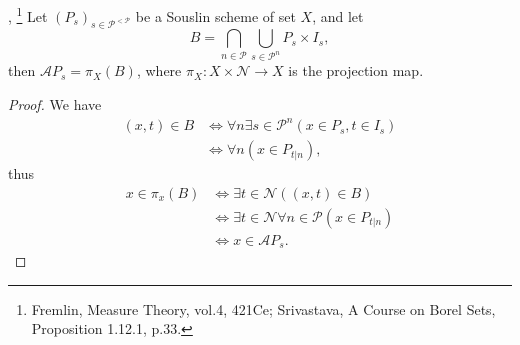 \begin{lemma} \label{L:souslin_prop},
  \footnote{Fremlin, Measure Theory, vol.4, 421Ce;
    Srivastava, A Course on Borel Sets, Proposition 1.12.1, p.33.}
Let $(P_s)_{s\in\mathcal{P}^{<\mathcal{P}}}$ be a Souslin scheme of set $X$, 
and let
\[
  B = \bigcap_{n\in\mathcal{P}} \bigcup_{s\in\mathcal{P}^n}
      P_s \times I_s,
\]
then $\mathcal{A} P_s = \pi_X(B)$, where $\pi_X: X\times\mathcal{N}\to X$ is the
projection map.
\end{lemma}
\begin{proof}
We have
\begin{align*}
  (x,t)\in B 
    & \iff \forall n \exists s\in\mathcal{P}^n (x\in P_s, t\in I_s) \\
    & \iff \forall n (x\in P_{t|n}),
\end{align*}
thus
\begin{align*}
  x\in \pi_x(B)
	& \iff \exists t\in\mathcal{N} ((x,t)\in B) \\
	& \iff \exists t\in\mathcal{N} \forall n\in\mathcal{P} (x\in P_{t|n}) \\
	& \iff x\in \mathcal{A} P_s.
\end{align*}
  
\end{proof}

